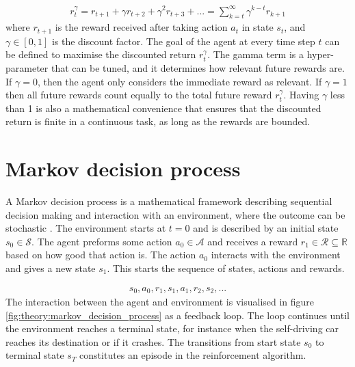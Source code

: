 \documentclass[class=book, crop=false, 11pt]{standalone}
\begin{document}
\begin{equation}
   \begin{aligned}\label{eq:theory:discounted_reward}
r^{\gamma}_{t} = r_{t+1} + \gamma r_{t+2} + \gamma^{2} r_{t+3} + ...
= \sum_{k=t}^{\infty} \gamma^{k-t}r_{k+1}
\end{aligned} 
\end{equation}
where $r_{t+1}$ is the reward received after taking action $a_{t}$ in state $s_{t}$, and $\gamma \in [0,1]$ is the discount factor. The goal of the agent at every time step $t$ can be defined to maximise the discounted return $r^{\gamma}_{t}$. The gamma term is a hyper-parameter that can be tuned, and it determines how relevant future rewards are. If $\gamma = 0$, then the agent only considers the immediate reward as relevant. If $\gamma = 1$ then all future rewards count equally to the total future reward $r^{\gamma}_{t}$. Having $\gamma$ less than 1 is also a mathematical convenience that ensures that the discounted return is finite in a continuous task, as long as the rewards are bounded. 

\section{Markov decision process}\label{section:markov_decision_process}

A Markov decision process is a mathematical framework describing sequential decision making and interaction with an environment, where the outcome can be stochastic \cite{Sutton1998}. The environment starts at $t=0$ and is described by an initial state $s_{0} \in \mathcal{S}$. The agent preforms some action $a_{0}\in \mathcal{A}$ and receives a reward $r_{1}\in \mathcal{R} \subseteq \mathbb{R} $ based on how good that action is. The action $a_{0}$ interacts with the environment and gives a new state $s_{1}$. This starts the sequence of states, actions and rewards.


\begin{equation}
   \begin{aligned}\label{eq:theory:trajectory}
s_{0},a_{0},r_{1},s_{1}, a_{1},r_{2},s_{2},...
\end{aligned} 
\end{equation}
The interaction between the agent and environment is visualised in figure \ref{fig:theory:markov_decision_process} as a feedback loop. The loop continues until the environment reaches a terminal state, for instance when the self-driving car reaches its destination or if it crashes. The transitions from start state $s_{0}$ to terminal state $s_{T}$ constitutes an episode in the reinforcement algorithm.  
\end{document}
